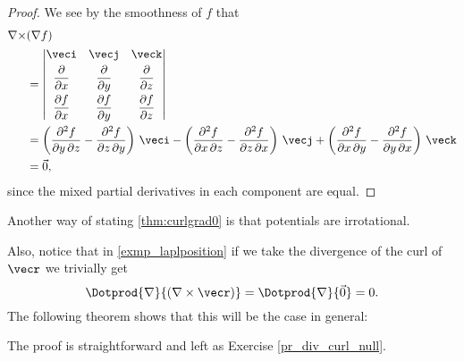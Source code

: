 
\begin{proof}
 We see by the smoothness of $f$ that
 \begin{align*}
  \nabla\times&(\nabla f) \\
   &= \begin{vmatrix}
   \veci & \vecj & \veck \vspace{1mm}\\ \dfrac{\partial}{\partial x} & \dfrac{\partial}{\partial y} &
    \dfrac{\partial}{\partial z} \vspace{1mm}\\
   \dfrac{\partial f}{\partial x} & \dfrac{\partial f}{\partial y} & \dfrac{\partial f}{\partial z}
   \end{vmatrix}\\
  &= \left( \frac{\partial^2 f}{\partial y\,\partial z}-\frac{\partial^2 f}{\partial z\,\partial y} \right) \,\veci
   - \left( \frac{\partial^2 f}{\partial x\,\partial z}-\frac{\partial^2 f}{\partial z\,\partial x} \right) \,\vecj
   + \left( \frac{\partial^2 f}{\partial x\,\partial y}-\frac{\partial^2 f}{\partial y\,\partial x} \right) \,\veck\\
  &= \vec0 ,
 \end{align*}
 since the mixed partial derivatives in each component are equal.
\end{proof}

Another way of stating \autoref{thm:curlgrad0} is that potentials are irrotational. 


Also, notice that in \autoref{exmp_laplposition} if we take the divergence of the curl of $\vecr$ we trivially get
\[
 \Dotprod{\nabla}{(\nabla\times\vecr)} = \Dotprod{\nabla}{\vec0} = 0 .
\]
The following theorem shows that this will be the case in general:


The proof is straightforward and left as Exercise \ref{pr_div_curl_null}.


